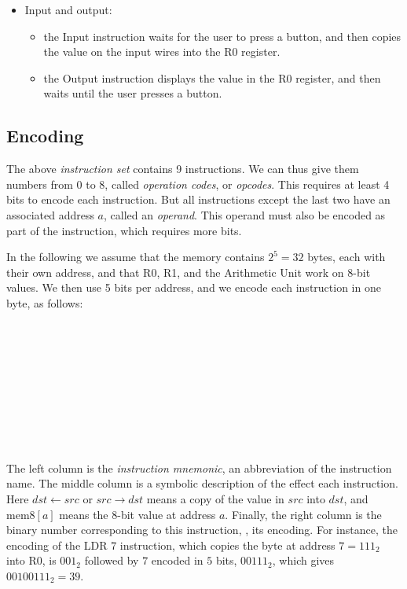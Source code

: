 \begin{itemize}
  \item Input and output:

  \begin{itemize}
    \item the Input instruction waits for the user to press a button, and then
    copies the value on the input wires into the R0 register.

    \item the Output instruction displays the value in the R0 register, and
    then waits until the user presses a button.
  \end{itemize}
\end{itemize}

\subsection{Encoding}

The above {\em instruction set} contains 9 instructions. We can thus give them
numbers from 0 to 8, called {\em operation codes}, or {\em opcodes}. This
requires at least 4 bits to encode each instruction. But all instructions
except the last two have an associated address $a$, called an {\em operand}.
This operand must also be encoded as part of the instruction, which requires
more bits.

In the following we assume that the memory contains $2^5=32$ bytes, each with
their own address, and that R0, R1, and the Arithmetic Unit work on 8-bit
values. We then use 5 bits per address, and we encode each instruction in one
byte, as follows:

\bigskip \noindent
{}\\
\\
\\
\\
\\
\\
\\
\\
\\

The left column is the {\em instruction mnemonic}, an abbreviation of the
instruction name. The middle column is a symbolic description of the effect
each instruction. Here $\mathit{dst} \leftarrow \mathit{src}$ or $\mathit{src}
\rightarrow \mathit{dst}$ means a copy of the value in $\mathit{src}$ into
$\mathit{dst}$, and $\mathrm{mem8}[a]$ means the 8-bit value at address $a$.
Finally, the right column is the binary number corresponding to this
instruction, \ie, its encoding. For instance, the encoding of the LDR 7
instruction, which copies the byte at address $7=111_2$ into R0, is
$001_2$ followed by $7$ encoded in $5$ bits, $00111_2$, which gives
$00100111_2=39$.

